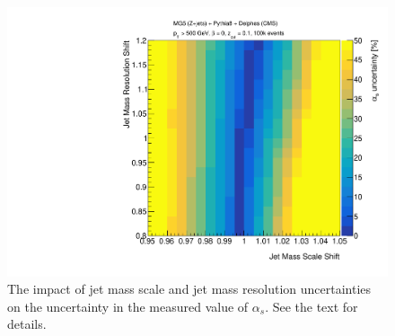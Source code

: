 \begin{figure}[h!]
\begin{center}
\includegraphics[width = 0.49\columnwidth]{figures/experimentaldemo/resolution_scan.pdf}
\end{center}
\caption{The impact of jet mass scale and jet mass resolution uncertainties on the uncertainty in the measured value of $\alpha_s$.  See the text for details.}
\label{fig:expfit}
\end{figure}


